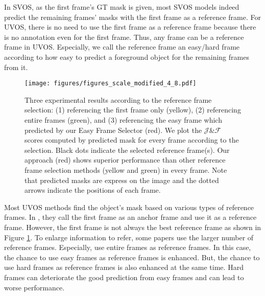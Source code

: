 \documentclass[letterpaper]{article} \usepackage{aaai22}  \usepackage{times}  \usepackage{helvet}  \usepackage{courier}  \usepackage[hyphens]{url}  \usepackage{graphicx} \urlstyle{rm} \def\UrlFont{\rm}  \usepackage{natbib}  \usepackage{caption} \DeclareCaptionStyle{ruled}{labelfont=normalfont,labelsep=colon,strut=off} \frenchspacing  \setlength{\pdfpagewidth}{8.5in}  \setlength{\pdfpageheight}{11in}  \usepackage{algorithm}
\begin{document}
In SVOS, as the first frame’s GT mask is given, most SVOS models indeed predict the remaining frames’ masks with the first frame as a reference frame. 
For UVOS, there is no need to use the first frame as a reference frame because there is no annotation even for the first frame. Thus, any frame can be a reference frame in UVOS. Especially, we call the reference frame an easy/hard frame according to how easy to predict a foreground object for the remaining frames from it.

\begin{figure}[t]
\centering
\texttt{[image: figures/figures\_scale\_modified\_4\_8.pdf]}
\caption{Three experimental results according to the reference frame selection: (1) referencing the first frame only (yellow), (2) referencing entire frames (green), and (3) referencing the easy frame which predicted by our Easy Frame Selector (red).
We plot the $\mathcal{J}$\&$\mathcal{F}$ scores computed by predicted mask for every frame according to the selection. Black dots indicate the selected reference frame(s).
Our approach (red) shows superior performance than other reference frame selection methods (yellow and green) in every frame. Note that predicted masks are express on the image and the dotted arrows indicate the positions of each frame.
}
\label{figure1}
\end{figure}

Most UVOS methods \citep{tokmakov2017learning,jain2017fusionseg,tokmakov2017learning2,cheng2017segflow,song2018pyramid,yang2019anchor,lu2019see,wang2019learning,faisal2019exploiting,siam2019video,tokmakov2019learning,zhou2020motion,zhuo2019unsupervised} find the object’s mask based on various types of reference frames. In \citet{yang2019anchor}, they call the first frame as an anchor frame and use it as a reference frame. However, the first frame is not always the best reference frame as shown in Figure \ref{figure1}. To enlarge information to refer, some papers \citep{tokmakov2017learning,song2018pyramid,lu2019see,wang2019learning,faisal2019exploiting,tokmakov2019learning,zhuo2019unsupervised} use the larger number of reference frames.  Especially, \citet{song2018pyramid,wang2019learning,faisal2019exploiting} use entire frames as reference frames.
In this case, the chance to use easy frames as reference frames is enhanced. But, the chance to use hard frames as reference frames is also enhanced at the same time. Hard frames can deteriorate the good prediction from easy frames and can lead to worse performance. 
\end{document}
